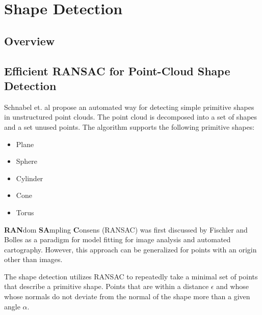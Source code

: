 \chapter{Shape Detection}
\section{Overview}


\section{Efficient RANSAC for Point-Cloud Shape Detection}
Schnabel et. al\cite{schnabel-2007-efficient} propose an automated way for detecting simple primitive shapes in unstructured point clouds. The point cloud is decomposed into a set of shapes and a set unused points. The algorithm supports the following primitive shapes: 
\begin{itemize}
	\item Plane
	\item Sphere
	\item Cylinder
	\item Cone
	\item Torus
\end{itemize} 

\textbf{RAN}dom \textbf{SA}mpling \textbf{C}onsens (RANSAC) was first discussed by Fischler and Bolles\cite{fischler1981random} as a paradigm for model fitting for image analysis and automated cartography. However, this approach can be generalized for points with an origin other than images. 

The shape detection utilizes RANSAC to repeatedly take a minimal set of points that describe a primitive shape. Points that are within a distance $\epsilon$ and whose
whose normals do not deviate from the normal of the shape more than a given angle $\alpha$.